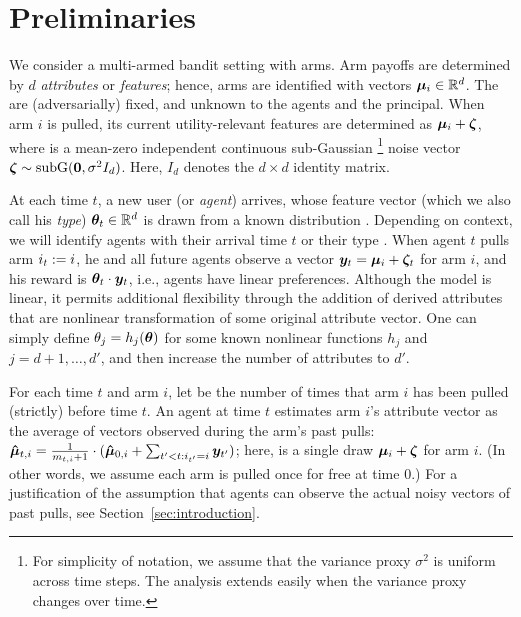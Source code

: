 \section{Preliminaries}
\label{sec:prob}

We consider a multi-armed bandit setting with \ARMNUM arms.
Arm payoffs are determined by $d$ \emph{attributes} or \emph{features};
hence, arms are identified with vectors $\ArmV{i} \in \R^d$.
The  are (adversarially) fixed, and unknown to the agents
and the principal.
When arm $i$ is pulled, its current utility-relevant features are
determined as $\ArmV{i} + \NoiseV$, where \NoiseV is a mean-zero
independent continuous sub-Gaussian%
\footnote{For simplicity of notation, we assume that the variance proxy
  $\sigma^2$ is uniform across time steps.
  The analysis extends easily when the variance proxy changes over time.}
noise vector $\NoiseV \sim \Normal{\vc{0}}{\sigma^2 I_{d}}$.
Here, $I_d$ denotes the $d \times d$ identity matrix.

At each time $t$, a new user (or \emph{agent}) arrives,
whose feature vector (which we also call his \emph{type})
$\AgentV{t} \in \R^d$ is drawn from a known distribution \AgentDist.
Depending on context, we will identify agents with their arrival time
$t$ or their type .
When agent $t$ pulls arm $\Pull{t} := i$,
he and all future agents observe a vector
$\ObsV{t} = \ArmV{i} + \NoiseV[t]$ for arm $i$,
and his reward is $\AgentV{t} \cdot \ObsV{t}$,
i.e., agents have linear preferences.
Although the model is linear, it permits additional flexibility
through the addition of derived attributes that are nonlinear
transformation of some original attribute vector.
One can simply define $\Ag{j} = h_j(\AgV)$ for some known
nonlinear functions $h_j$ and $j=d+1,\ldots,d'$, and then increase the
number of attributes to $d'$.

For each time $t$ and arm $i$, let  be the number of
times that arm $i$ has been pulled (strictly) before time $t$.
An agent at time $t$ estimates arm $i$'s attribute vector as the
average of vectors observed during the arm's past pulls:
$\ArmEV{t}{i} = \frac{1}{\NumPull{t}{i}+1} \cdot
(\ArmEV{0}{i} + \sum_{t'<t: \Pull{t'} = i} \ObsV{t'})$;
here,  is a single draw $\ArmV{i} + \NoiseV$ for arm $i$.
(In other words, we assume each arm is pulled once for free at time 0.)
For a justification of the assumption that agents can observe
the actual noisy vectors  of past pulls, see
Section~\ref{sec:introduction}.
  
